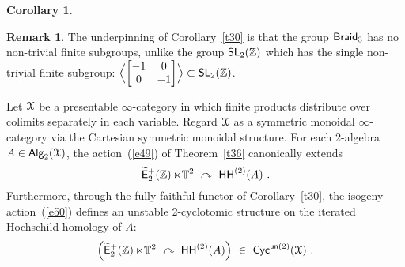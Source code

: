 \documentclass{amsart}
\newenvironment{mythm}[1]
  {\renewcommand\theinnercustomthm{#1}\innercustomthm}
  {\endinnercustomthm}
\newtheorem{cor}[theorem]{Corollary}
\theoremstyle{definition}
\newtheorem{remark}[theorem]{Remark}
\theoremstyle{remark}
\DeclareMathOperator{\Alg}{\sf Alg}
\newcommand{\lacts}{\curvearrowright}
\newcommand{\lag}{\langle}
\newcommand{\rag}{\rangle}
\newcommand{\w}{\widetilde}
\DeclareMathOperator{\Braid}{{\sf Braid}_3}
\DeclareMathOperator{\Ebraid}{\w{\sf E}_{2}^{+}(\ZZ)}
\DeclareMathOperator{\SL}{\sf SL}
\DeclareMathOperator{\HHt}{{\sf HH}^{(2)}}
\begin{document}
{\begin{cor}
\end{cor}




\begin{remark}
The underpinning of Corollary~\ref{t30} is that the group $\Braid$ has no non-trivial finite subgroups, unlike the group $\SL_2(\ZZ)$ which has the single non-trivial finite subgroup: $\Bigl\lag \begin{bmatrix}-1 & 0 \\ 0 & -1 \end{bmatrix} \Bigr\rag \subset \SL_2(\ZZ)$.

\end{remark}

}




\begin{mythm}{B.2}
\label{t51}

Let $\mathcal X$ be a presentable $\infty$-category in which finite products distribute over colimits separately in each variable.  
Regard $\mathcal X$ as a symmetric monoidal $\infty$-category via the Cartesian symmetric monoidal structure.  
For each 2-algebra $A\in \Alg_2(\cX)$, 
the action~(\ref{e49}) of Theorem~\ref{t36} canonically extends
\begin{equation}
\label{e50}
\Ebraid \ltimes \TT^2
~\lacts~
\HHt(A)
~.
\end{equation}
Furthermore, through the fully faithful functor of Corollary~\ref{t30}, the isogeny-action~(\ref{e50}) defines an unstable 2-cyclotomic structure on the iterated Hochschild homology of $A$:
\[
\Bigl(
\Ebraid \ltimes \TT^2 
~\lacts~
\HHt(A)
\Bigr)
~\in~
{\sf Cyc}^{{\sf un} (2)}(\cX)
~.
\]


\end{mythm}
\end{document}
